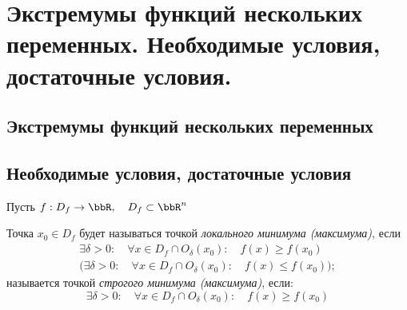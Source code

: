 \chapter{Экстремумы функций нескольких переменных. Необходимые условия, достаточные условия.}
\section{Экстремумы функций нескольких переменных}
\section{Необходимые условия, достаточные условия}

Пусть $f:D_f\to\bbR, \quad D_f \subset\bbR^n$
\begin{defn}
Точка $x_0\in D_f$ будет называться точкой \textit{локального минимума (максимума)}, если
\begin{gather}
\exists \delta>0:\quad\forall x\in D_f\cap O_{\delta}(x_0): \quad f(x)\ge f(x_0) \label{lec31e1}\\
\bigl(\exists \delta>0:\quad\forall x\in D_f\cap O_{\delta}(x_0): \quad f(x)\le f(x_0)\bigr); \label{lec31e2}
\end{gather} 
называется точкой \textit{строгого минимума (максимума)}, если:
\begin{equation}
\exists \delta>0:\quad\forall x\in D_f\cap O_{\delta}(x_0): \quad f(x)\ge f(x_0)
\end{equation}
\end{defn} 